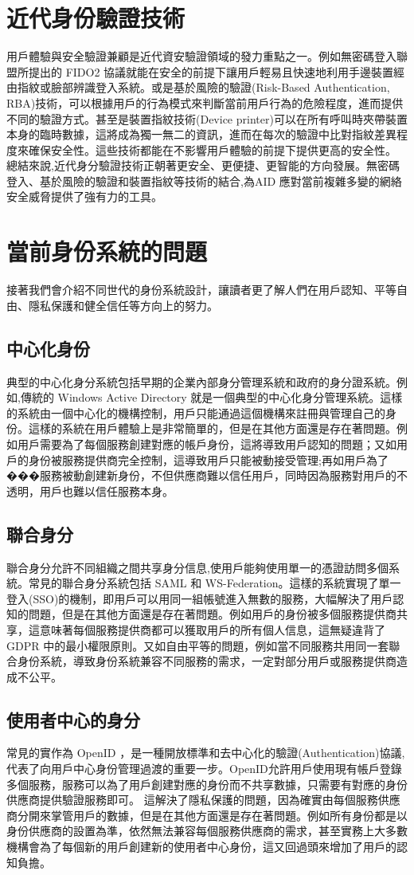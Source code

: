 \section{近代身份驗證技術}
用戶體驗與安全驗證兼顧是近代資安驗證領域的發力重點之一。例如無密碼登入聯盟所提出的 FIDO2 協議就能在安全的前提下讓用戶輕易且快速地利用手邊裝置經由指紋或臉部辨識登入系統。或是基於風險的驗證(Risk-Based Authentication, RBA)技術，可以根據用戶的行為模式來判斷當前用戶行為的危險程度，進而提供不同的驗證方式。甚至是裝置指紋技術(Device printer)可以在所有呼叫時夾帶裝置本身的臨時數據，這將成為獨一無二的資訊，進而在每次的驗證中比對指紋差異程度來確保安全性。這些技術都能在不影響用戶體驗的前提下提供更高的安全性。
總結來說,近代身分驗證技術正朝著更安全、更便捷、更智能的方向發展。無密碼登入、基於風險的驗證和裝置指紋等技術的結合,為AID 應對當前複雜多變的網絡安全威脅提供了強有力的工具。
\section{當前身份系統的問題}
接著我們會介紹不同世代的身份系統設計，讓讀者更了解人們在用戶認知、平等自由、隱私保護和健全信任等方向上的努力。
\subsection{中心化身份}
典型的中心化身分系統包括早期的企業內部身分管理系統和政府的身分證系統。例如,傳統的 Windows Active Directory 就是一個典型的中心化身分管理系統。這樣的系統由一個中心化的機構控制，用戶只能通過這個機構來註冊與管理自己的身份。這樣的系統在用戶體驗上是非常簡單的，但是在其他方面還是存在著問題。例如用戶需要為了每個服務創建對應的帳戶身份，這將導致用戶認知的問題；又如用戶的身份被服務提供商完全控制，這導致用戶只能被動接受管理;再如用戶為了���服務被動創建新身份，不但供應商難以信任用戶，同時因為服務對用戶的不透明，用戶也難以信任服務本身。
\subsection{聯合身分}
聯合身分允許不同組織之間共享身分信息,使用戶能夠使用單一的憑證訪問多個系統。常見的聯合身分系統包括 SAML 和 WS-Federation。這樣的系統實現了單一登入(SSO)的機制，即用戶可以用同一組帳號進入無數的服務，大幅解決了用戶認知的問題，但是在其他方面還是存在著問題。例如用戶的身份被多個服務提供商共享，這意味著每個服務提供商都可以獲取用戶的所有個人信息，這無疑違背了 GDPR 中的最小權限原則。又如自由平等的問題，例如當不同服務共用同一套聯合身份系統，導致身份系統兼容不同服務的需求，一定對部分用戶或服務提供商造成不公平。
\subsection{使用者中心的身分}
常見的實作為 OpenID ，是一種開放標準和去中心化的驗證(Authentication)協議,代表了向用戶中心身份管理過渡的重要一步。OpenID允許用戶使用現有帳戶登錄多個服務，服務可以為了用戶創建對應的身份而不共享數據，只需要有對應的身份供應商提供驗證服務即可。
這解決了隱私保護的問題，因為確實由每個服務供應商分開來掌管用戶的數據，但是在其他方面還是存在著問題。例如所有身份都是以身份供應商的設置為準，依然無法兼容每個服務供應商的需求，甚至實務上大多數機構會為了每個新的用戶創建新的使用者中心身份，這又回過頭來增加了用戶的認知負擔。
